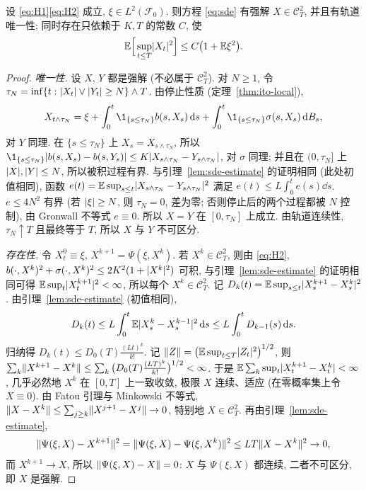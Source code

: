 \begin{theorem}[强解的存在唯一性]\label{thm:sde-existence}
设 \eqref{eq:H1}\eqref{eq:H2} 成立, $\xi\in L^2(\mathcal{F}_0)$. 则方程 \eqref{eq:sde} 有强解 $X\in\mathscr{C}^2_T$, 并且有轨道唯一性; 同时存在只依赖于 $K,T$ 的常数 $C$, 使
\begin{equation}\label{eq:sde-moment}
\mathbb{E}\Big[\sup_{t\le T}\lvert X_t\rvert^2\Big]\le C\big(1+\mathbb{E}\xi^2\big).
\end{equation}
\end{theorem}

\begin{proof}
\emph{唯一性.} 设 $X$, $Y$ 都是强解 (不必属于 $\mathscr{C}^2_T$). 对 $N\ge1$, 令 $\tau_N=\inf\{t:\lvert X_t\rvert\vee\lvert Y_t\rvert\ge N\}\wedge T$. 由停止性质 (定理~\ref{thm:ito-local}),
\[
X_{t\wedge\tau_N}=\xi+\int_0^t\1_{\{s\le\tau_N\}}b(s,X_s)\dd s+\int_0^t\1_{\{s\le\tau_N\}}\sigma(s,X_s)\dd B_s,
\]
对 $Y$ 同理. 在 $\{s\le\tau_N\}$ 上 $X_s=X_{s\wedge\tau_N}$, 所以 $\1_{\{s\le\tau_N\}}\abs{b(s,X_s)-b(s,Y_s)}\le K\abs{X_{s\wedge\tau_N}-Y_{s\wedge\tau_N}}$, 对 $\sigma$ 同理; 并且在 $(0,\tau_N]$ 上 $\lvert X\rvert,\lvert Y\rvert\le N$, 所以被积过程有界. 与引理~\ref{lem:sde-estimate} 的证明相同 (此处初值相同), 函数 $e(t)=\mathbb{E}\sup_{s\le t}\lvert X_{s\wedge\tau_N}-Y_{s\wedge\tau_N}\rvert^2$ 满足 $e(t)\le L\int_0^te(s)\dd s$. $e\le4N^2$ 有界 (若 $\lvert\xi\rvert\ge N$, 则 $\tau_N=0$, 差为零; 否则停止后的两个过程都被 $N$ 控制), 由 Gronwall 不等式 $e\equiv0$. 所以 $X=Y$ 在 $[0,\tau_N]$ 上成立. 由轨道连续性, $\tau_N\uparrow T$ 且最终等于 $T$, 所以 $X$ 与 $Y$ 不可区分.

\emph{存在性.} 令 $X^0_t\equiv\xi$, $X^{k+1}=\Psi(\xi,X^k)$. 若 $X^k\in\mathscr{C}^2_T$, 则由 \eqref{eq:H2}, $b(\cdot,X^k)^2+\sigma(\cdot,X^k)^2\le2K^2(1+\lvert X^k\rvert^2)$ 可积, 与引理~\ref{lem:sde-estimate} 的证明相同可得 $\mathbb{E}\sup_t\lvert X^{k+1}_t\rvert^2<\infty$, 所以每个 $X^k\in\mathscr{C}^2_T$. 记 $D_k(t)=\mathbb{E}\sup_{s\le t}\lvert X^{k+1}_s-X^k_s\rvert^2$. 由引理~\ref{lem:sde-estimate} (初值相同),
\[
D_k(t)\le L\int_0^t\mathbb{E}\lvert X^k_s-X^{k-1}_s\rvert^2\mathop{}\!\mathrm{d} s\le L\int_0^tD_{k-1}(s)\mathop{}\!\mathrm{d} s.
\]
归纳得 $D_k(t)\le D_0(T)\frac{(Lt)^k}{k!}$. 记 $\lVert Z\rVert=\big(\mathbb{E}\sup_{t\le T}\lvert Z_t\rvert^2\big)^{1/2}$, 则 $\sum_k\lVert X^{k+1}-X^k\rVert\le\sum_k\big(D_0(T)\frac{(LT)^k}{k!}\big)^{1/2}<\infty$. 于是 $\mathbb{E}\sum_k\sup_t\lvert X^{k+1}_t-X^k_t\rvert<\infty$, 几乎必然地 $X^k$ 在 $[0,T]$ 上一致收敛, 极限 $X$ 连续、适应 (在零概率集上令 $X\equiv0$). 由 Fatou 引理与 Minkowski 不等式, $\lVert X-X^k\rVert\le\sum_{j\ge k}\lVert X^{j+1}-X^j\rVert\to0$, 特别地 $X\in\mathscr{C}^2_T$. 再由引理~\ref{lem:sde-estimate},
\[
\lVert\Psi(\xi,X)-X^{k+1}\rVert^2=\lVert\Psi(\xi,X)-\Psi(\xi,X^k)\rVert^2\le LT\lVert X-X^k\rVert^2\to0,
\]
而 $X^{k+1}\to X$, 所以 $\lVert\Psi(\xi,X)-X\rVert=0$: $X$ 与 $\Psi(\xi,X)$ 都连续, 二者不可区分, 即 $X$ 是强解.


\end{proof}
